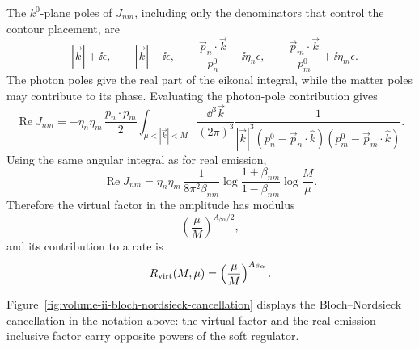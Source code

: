 The \(k^0\)-plane poles of \(J_{nm}\), including only the denominators that
control the contour placement, are
\[
  -|\vec k|+\ii\epsilon,\qquad
  |\vec k|-\ii\epsilon,\qquad
  \frac{\vec p_n\cdot\vec k}{p_n^0}-\ii\eta_n\epsilon,\qquad
  \frac{\vec p_m\cdot\vec k}{p_m^0}+\ii\eta_m\epsilon .
\]
The photon poles give the real part of the eikonal integral, while the
matter poles may contribute to its phase.  Evaluating the photon-pole
contribution gives
\[
  \operatorname{Re}J_{nm}
  =
  -\eta_n\eta_m\,
  \frac{p_n\cdot p_m}{2}
  \int_{\mu<|\vec k|<M}
  \frac{\dd^3\vec k}{(2\pi)^3}
  \frac{1}
       {|\vec k|^3
        (p_n^0-\vec p_n\cdot\hat k)
        (p_m^0-\vec p_m\cdot\hat k)} .
\]
Using the same angular integral as for real emission,
\[
  \operatorname{Re}J_{nm}
  =
  \eta_n\eta_m\,
  \frac{1}{8\pi^2\beta_{nm}}
  \log\frac{1+\beta_{nm}}{1-\beta_{nm}}
  \log\frac{M}{\mu}.
\]
Therefore the virtual factor in the amplitude has modulus
\[
  \left(\frac{\mu}{M}\right)^{A_{\beta\alpha}/2},
\]
and its contribution to a rate is
\[
  R_{\rm virt}(M,\mu)
  =
  \left(\frac{\mu}{M}\right)^{A_{\beta\alpha}} .
\]

Figure~\ref{fig:volume-ii-bloch-nordsieck-cancellation} displays the
Bloch--Nordsieck cancellation in the notation above: the virtual factor and the
real-emission inclusive factor carry opposite powers of the soft regulator.

